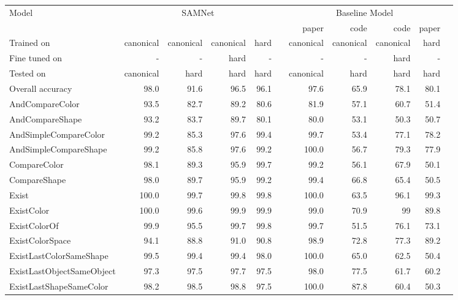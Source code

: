 \begin{table}[htb]
	\centering
	\begin{adjustbox}{width=\textwidth}
		\begin{tabular}{l r r r r r r r r r r}
			\toprule[1.25pt]
			Model & \multicolumn{4}{c}{SAMNet} &  &\multicolumn{4}{c}{Baseline Model} \\
			\cmidrule(lr){2-5}
			\cmidrule(lr){7-10}
			&&&&& & paper & code & code & paper\\
			\cmidrule(lr){7-10}
			Trained on       & canonical & canonical & canonical & hard &           &  canonical  & canonical  & canonical & hard \\
			Fine tuned on  & - & - & hard  & - &           & -   & - & hard & - \\
			Tested on        & canonical & hard & hard & hard &            &canonical  & hard & hard & hard  \\
			\midrule[1pt]
			Overall accuracy & 98.0 & 91.6 & 96.5  & 96.1 &           & 97.6  & 65.9 & 78.1& 80.1 \\
			\midrule[1pt]
			AndCompareColor			&	93.5	&	82.7	&	89.2	&	80.6	&	&	81.9	&	57.1	&	60.7	&	51.4	 \\
			AndCompareShape			&	93.2	&	83.7	&	89.7	&	80.1	&	&	80.0	&	53.1	&	50.3	&	50.7 \\
			AndSimpleCompareColor		&	99.2	&	85.3	&	97.6	&	99.4	&	&	99.7	&	53.4	&	77.1	&	78.2 \\
			AndSimpleCompareShape		&	99.2	&	85.8	&	97.6	&	99.2	&	&	100.0	&	56.7	&	79.3	&	77.9 \\
			CompareColor			&	98.1	&	89.3	&	95.9	&	99.7	&	&	99.2	&	56.1	&	67.9	&	50.1 \\
			CompareShape			&	98.0	&	89.7	&	95.9	&	99.2	&	&	99.4	&	66.8	&	65.4	&	50.5	 \\
			Exist				&	100.0	&	99.7	&	99.8	&	99.8	&	&	100.0	&	63.5	&	96.1	&	99.3 \\
			ExistColor			&	100.0	&	99.6	&	99.9	&	99.9	&	&	99.0	&	70.9	&	99	&	89.8 \\
			ExistColorOf			&	99.9	&	95.5	&	99.7	&	99.8	&	&	99.7	&	51.5	&	76.1	&	73.1 \\
			ExistColorSpace			&	94.1	&	88.8	&	91.0	&	90.8	&	&	98.9	&	72.8	&	77.3	&	89.2 \\
			ExistLastColorSameShape		&	99.5	&	99.4	&	99.4	&	98.0	&	&	100.0	&	65.0	&	62.5	&	50.4 \\
			ExistLastObjectSameObject	&	97.3	&	97.5	&	97.7	&	97.5	&	&	98.0	&	77.5	&	61.7	&	60.2 \\
			ExistLastShapeSameColor		&	98.2	&	98.5	&	98.8	&	97.5	&	&	100.0	&	87.8	&	60.4	&	50.3 \\

\end{tabular}
\end{adjustbox}
\end{table}
